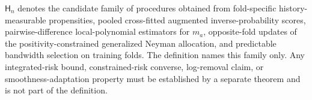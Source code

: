 \(\mathsf H_n\) denotes the candidate family of procedures obtained from fold-specific history-measurable propensities, pooled cross-fitted augmented inverse-probability scores, pairwise-difference local-polynomial estimators for \(m_a\), opposite-fold updates of the positivity-constrained generalized Neyman allocation, and predictable bandwidth selection on training folds.  The definition names this family only.  Any integrated-risk bound, constrained-risk converse, log-removal claim, or smoothness-adaptation property must be established by a separate theorem and is not part of the definition.